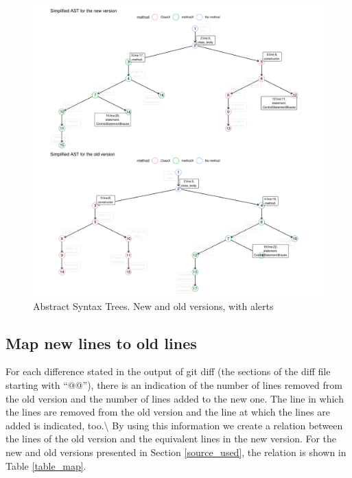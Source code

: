 \documentclass[
]{article}
\begin{document}
\begin{figure}[H]
\includegraphics[width=1\linewidth]{report_files/figure-latex/unnamed-chunk-5-1} \caption{Abstract Syntax Trees. New and old versions, with alerts \label{AST_compare_id_alerts}}\label{fig:unnamed-chunk-5}
\end{figure}

\normalsize

\subsection{Map new lines to old lines}\label{map}

For each difference stated in the output of git diff (the sections of
the diff file starting with ``@@''), there is an indication of the
number of lines removed from the old version and the number of lines
added to the new one. The line in which the lines are removed from the
old version and the line at which the lines are added is indicated,
too.\textbackslash{} By using this information we create a relation
between the lines of the old version and the equivalent lines in the new
version. For the new and old versions presented in Section
\ref{source_used}, the relation is shown in Table \ref{table_map}.

\small
\end{document}

